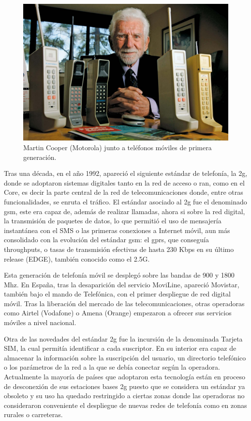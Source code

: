 \begin{figure}[h]
    \centering
        \includegraphics[width=15cm]{archivos/motorola}
        \caption{Martin Cooper (Motorola) junto a teléfonos móviles de primera generación. \cite{Huffaker2009}}
        \label{fig:motorola}
\end{figure}

\par Tras una década, en el año 1992, apareció el siguiente estándar de telefonía, la \gls{2g}, donde se adoptaron sistemas digitales tanto en la red de acceso o \gls{ran}, como en el Core, es decir la parte central de la red de telecomunicaciones donde, entre otras funcionalidades, se enruta el tráfico.
El estándar asociado al \gls{2g} fue el denominado \gls{gsm}, este era capaz de, además de realizar llamadas, ahora si sobre la red digital, la transmisión de paquetes de datos, lo que permitió el uso de mensajería instantánea con el SMS o las primeras conexiones a Internet móvil, aun más consolidado con la evolución del estándar \gls{gsm}: el \gls{gprs}, que conseguía throughputs, o tasas de transmisión efectivas de hasta 230 Kbps en su último release (EDGE), también conocido como el 2.5G. \cite{LaCuevaGSM2014} 
\\
\par Esta generación de telefonía móvil se desplegó sobre las bandas de 900 y 1800 Mhz. En España, tras la desaparición del servicio MoviLine, apareció Movistar, también bajo el mando de Telefónica, con el primer despliegue de red digital móvil. Tras la liberación del mercado de las telecomunicaciones, otras operadoras como Airtel (Vodafone) o Amena (Orange) empezaron a ofrecer sus servicios móviles a nivel nacional. \cite{Wikipedia2019b}
\\
\par Otra de las novedades del estándar \gls{2g} fue la incursión de la denominada Tarjeta SIM, la cual permitía identificar a cada suscriptor. En su interior era capaz de almacenar la información sobre la suscripción del usuario, un directorio telefónico o los parámetros de la red a la que se debía conectar según la operadora. Actualmente la mayoría de países que adoptaron esta tecnología están en proceso de desconexión de sus estaciones bases \gls{2g} puesto que se considera un estándar ya obsoleto y su uso ha quedado restringido a ciertas zonas donde las operadoras no consideraron conveniente el despliegue de nuevas redes de telefonía como en zonas rurales o carreteras. \cite{Wikipedia2019b}

